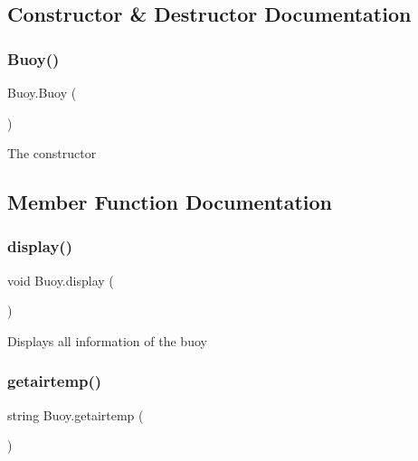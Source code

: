 \subsection{Constructor \& Destructor Documentation}
\mbox{\label{class_buoy_aa6aa319139546405b1590e2ef8a292ae}} 
\subsubsection{\texorpdfstring{Buoy()}{Buoy()}}
{\footnotesize\ttfamily Buoy.\+Buoy (\begin{DoxyParamCaption}{ }\end{DoxyParamCaption})\hspace{0.3cm}{\ttfamily [inline]}}

The constructor 

\subsection{Member Function Documentation}
\mbox{\label{class_buoy_a9e5167e5f0967ee99f03ba223236b2d4}} 
\subsubsection{\texorpdfstring{display()}{display()}}
{\footnotesize\ttfamily void Buoy.\+display (\begin{DoxyParamCaption}{ }\end{DoxyParamCaption})\hspace{0.3cm}{\ttfamily [inline]}}

Displays all information of the buoy \mbox{\label{class_buoy_a7c7561385cfeb04abb1e40cdf52b9118}} 
\subsubsection{\texorpdfstring{getairtemp()}{getairtemp()}}
{\footnotesize\ttfamily string Buoy.\+getairtemp (\begin{DoxyParamCaption}{ }\end{DoxyParamCaption})\hspace{0.3cm}{\ttfamily [inline]}}

